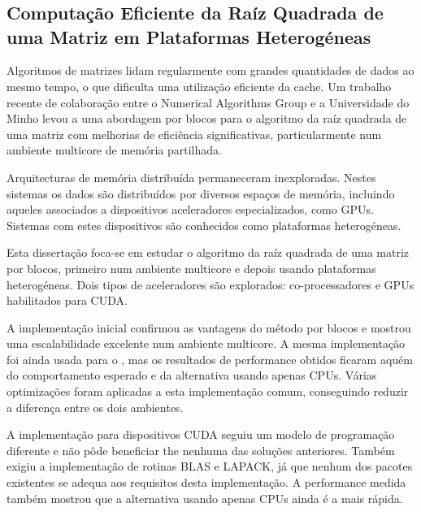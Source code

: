 \documentclass[../thesis]{subfiles}
\begin{document}
	\chapter*{\abstractname}
		\section*{Computação Eficiente da Raíz Quadrada de uma Matriz em Plataformas Heterogéneas}

		Algoritmos de matrizes lidam regularmente com grandes quantidades de dados ao mesmo tempo, o que dificulta uma utilização eficiente da cache. Um trabalho recente de colaboração entre o Numerical Algorithms Group e a Universidade do Minho levou a uma abordagem por blocos para o algoritmo da raíz quadrada de uma matriz com melhorias de eficiência significativas, particularmente num ambiente multicore de memória partilhada.

		Arquitecturas de memória distribuída permaneceram inexploradas. Nestes sistemas os dados são distribuídos por diversos espaços de memória, incluindo aqueles associados a dispositivos aceleradores especializados, como GPUs. Sistemas com estes dispositivos são conhecidos como plataformas heterogéneas.

		Esta dissertação foca-se em estudar o algoritmo da raíz quadrada de uma matriz por blocos, primeiro num ambiente multicore e depois usando plataformas heterogéneas. Dois tipos de aceleradores são explorados: co-processadores \intel\xeonphi e GPUs \nvidia habilitados para CUDA.

		A implementação inicial confirmou as vantagens do método por blocos e mostrou uma escalabilidade excelente num ambiente multicore. A mesma implementação foi ainda usada para o \intel\xeonphi, mas os resultados de performance obtidos ficaram aquém do comportamento esperado e da alternativa usando apenas CPUs. Várias optimizações foram aplicadas a esta implementação comum, conseguindo reduzir a diferença entre os dois ambientes.

		A implementação para dispositivos CUDA seguiu um modelo de programação diferente e não pôde beneficiar the nenhuma das soluções anteriores. Também exigiu a implementação de rotinas BLAS e LAPACK, já que nenhum dos pacotes existentes se adequa aos requisitos desta implementação. A performance medida também mostrou que a alternativa usando apenas CPUs ainda é a mais rápida.
\end{document}
